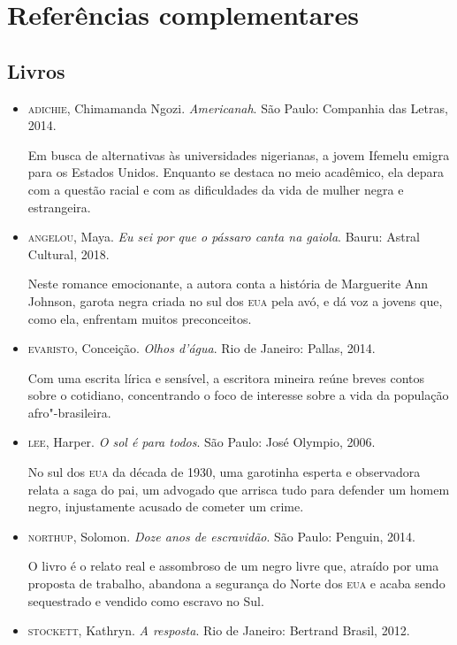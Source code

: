\documentclass[11pt]{extarticle}
\begin{document}
\section{Referências complementares}

\subsection{Livros}
\begin{itemize}
\item\textsc{adichie}, Chimamanda Ngozi. \textit{Americanah}. São Paulo: Companhia
  das Letras, 2014.

Em busca de alternativas às universidades nigerianas, a jovem Ifemelu
emigra para os Estados Unidos. Enquanto se destaca no meio acadêmico,
ela depara com a questão racial e com as dificuldades da vida de mulher
negra e estrangeira.

\item\textsc{angelou}, Maya. \textit{Eu sei por que o pássaro canta na gaiola}.
  Bauru: Astral Cultural, 2018.

Neste romance emocionante, a autora conta a história de Marguerite Ann
Johnson, garota negra criada no sul dos \textsc{eua} pela avó, e dá voz a jovens
que, como ela, enfrentam muitos preconceitos.

\item\textsc{evaristo}, Conceição. \textit{Olhos d'água}. Rio de Janeiro: Pallas,
  2014.

Com uma escrita lírica e sensível, a escritora mineira reúne breves
contos sobre o cotidiano, concentrando o foco de interesse sobre a vida
da população afro"-brasileira.

\item\textsc{lee}, Harper. \textit{O sol é para todos}. São Paulo: José Olympio,
  2006.

No sul dos \textsc{eua} da década de 1930, uma garotinha esperta e observadora
relata a saga do pai, um advogado que arrisca tudo para defender um
homem negro, injustamente acusado de cometer um crime.

\item\textsc{northup}, Solomon. \textit{Doze anos de escravidão}. São Paulo:
  Penguin, 2014.

O livro é o relato real e assombroso de um negro livre que, atraído por
uma proposta de trabalho, abandona a segurança do Norte dos \textsc{eua} e acaba
sendo sequestrado e vendido como escravo no Sul.

\item\textsc{stockett}, Kathryn. \textit{A resposta}. Rio de Janeiro: Bertrand
  Brasil, 2012.


\end{itemize}
\end{document}

